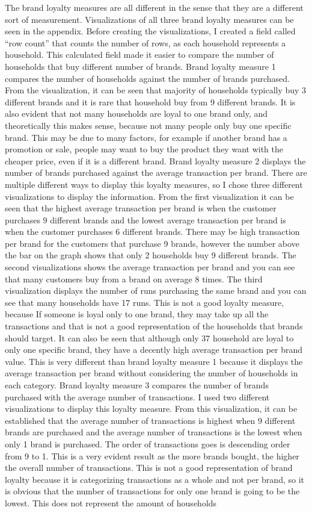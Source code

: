 \documentclass[11pt]{article}
\begin{document}
The brand loyalty measures are all different in the sense that they are a different sort of measurement. Visualizations of all three brand loyalty measures can be seen in the appendix. Before creating the visualizations, I created a field called “row count” that counts the number of rows, as each household represents a household. This calculated field made it easier to compare the number of households that buy different number of brands. Brand loyalty measure 1 compares the number of households against the number of brands purchased. From the visualization, it can be seen that majority of households typically buy 3 different brands and it is rare that household buy from 9 different brands. It is also evident that not many households are loyal to one brand only, and theoretically this makes sense, because not many people only buy one specific brand. This may be due to many factors, for example if another brand has a promotion or sale, people may want to buy the product they want with the cheaper price, even if it is a different brand.  Brand loyalty measure 2 displays the number of brands purchased against the average transaction per brand. There are multiple different ways to display this loyalty measures, so I chose three different visualizations to display the information. From the first visualization it can be seen that the highest average transaction per brand is when the customer purchases 9 different brands and the lowest average transaction per brand is when the customer purchases 6 different brands. There may be high transaction per brand for the customers that purchase 9 brands, however the number above the bar on the graph shows that only 2 households buy 9 different brands. The second visualizations shows the average transaction per brand and you can see that many customers buy from a brand on average 8 times. The third visualization displays the number of runs purchasing the same brand and you can see that many households have 17 runs. This is not a good loyalty measure, because If someone is loyal only to one brand, they may take up all the transactions and that is not a good representation of the households that brands should target. It can also be seen that although only 37 household are loyal to only one specific brand, they have a decently high average transaction per brand value. This is very different than brand loyalty measure 1 because it displays the average transaction per brand without considering the number of households in each category. Brand loyalty measure 3 compares the number of brands purchased with the average number of transactions. I used two different visualizations to display this loyalty measure. From this visualization, it can be established that the average number of transactions is highest when 9 different brands are purchased and the average number of transactions is the lowest when only 1 brand is purchased. The order of transactions goes is descending order from 9 to 1. This is a very evident result as the more brands bought, the higher the overall number of transactions. This is not a good representation of brand loyalty because it is categorizing transactions as a whole and not per brand, so it is obvious that the number of transactions for only one brand is going to be the lowest. This does not represent the amount of households 
\end{document}
